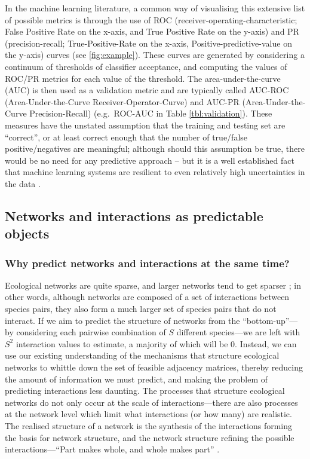 In the machine learning literature, a common way of visualising this
extensive list of possible metrics is through the use of ROC
(receiver-operating-characteristic; False Positive Rate on the x-axis,
and True Positive Rate on the y-axis) and PR (precision-recall;
True-Positive-Rate on the x-axis, Positive-predictive-value on the
y-axis) curves (see \autoref{fig:example}). These curves are generated by
considering a continuum of thresholds of classifier acceptance, and
computing the values of ROC/PR metrics for each value of the threshold.
The area-under-the-curve (AUC) is then used as a validation metric and
are typically called AUC-ROC (Area-Under-the-Curve
Receiver-Operator-Curve) and AUC-PR (Area-Under-the-Curve
Precision-Recall) (e.g.~ROC-AUC in Table \ref{tbl:validation}). These measures have
the unstated assumption that the training and testing set are
``correct'', or at least correct enough that the number of true/false
positive/negatives are meaningful; although should this assumption be
true, there would be no need for any predictive approach -- but it is a
well established fact that machine learning systems are resilient to
even relatively high uncertainties in the data \cite{Halevy2009UnrEff}.

\subsection{Networks and interactions as predictable
objects}\label{networks-and-interactions-as-predictable-objects}

\subsubsection{Why predict networks and interactions at the same
time?}\label{why-predict-networks-and-interactions-at-the-same-time}

Ecological networks are quite sparse, and larger networks tend to get
sparser \cite{MacDonald2020RevLin}; in other words, although networks
are composed of a set of interactions between species pairs, they also
form a much larger set of species pairs that do not interact. If we aim
to predict the structure of networks from the ``bottom-up''--- by
considering each pairwise combination of \(S\) different species---we
are left with \(S^2\) interaction values to estimate, a majority of
which will be 0. Instead, we can use our existing understanding of the
mechanisms that structure ecological networks to whittle down the set of
feasible adjacency matrices, thereby reducing the amount of information
we must predict, and making the problem of predicting interactions less
daunting. The processes that structure ecological networks do not only
occur at the scale of interactions---there are also processes at the
network level which limit what interactions (or how many) are realistic.
The realised structure of a network is the synthesis of the interactions
forming the basis for network structure, and the network structure
refining the possible interactions---``Part makes whole, and whole makes
part'' \cite{Levins1987DiaBio}.

